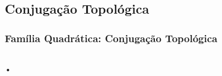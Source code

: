 \subsection{Conjugação Topológica}


\begin{frame}
\vspace{5pt}
\frametitle{Família Quadrática: Conjugação Topológica}
\begin{columns}
\column{\dimexpr\paperwidth-15pt}

•

\end{columns}
\end{frame}

